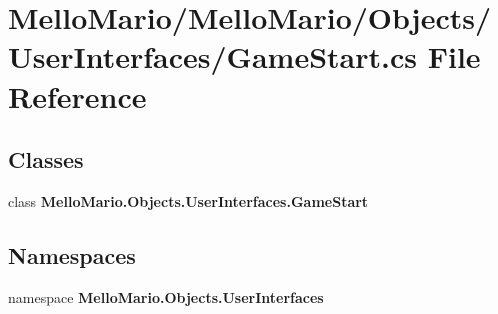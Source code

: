 \section{Mello\+Mario/\+Mello\+Mario/\+Objects/\+User\+Interfaces/\+Game\+Start.cs File Reference}
\label{GameStart_8cs}
\subsection*{Classes}
\begin{DoxyCompactItemize}
\item 
class \textbf{ Mello\+Mario.\+Objects.\+User\+Interfaces.\+Game\+Start}
\end{DoxyCompactItemize}
\subsection*{Namespaces}
\begin{DoxyCompactItemize}
\item 
namespace \textbf{ Mello\+Mario.\+Objects.\+User\+Interfaces}
\end{DoxyCompactItemize}

